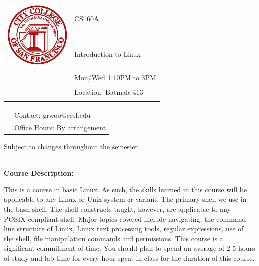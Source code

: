 \documentclass[11pt]{article}
\begin{document}
\begin{tabular}{ l l }
  \multirow{3}{*}{\includegraphics[height=1.25in,width=1.25in]{logo_ccsf.png}} & \LARGE CS160A \\\\
                                                                             & \LARGE Introduction to Linux \\\\
  & \LARGE Mon/Wed 1:10PM to 3PM \\\\
  & \LARGE Location: Batmale 413\\\\
\end{tabular}
\vspace{10mm}

\begin{tabular}{ l l }
  & \large Contact: grwoo@ccsf.edu \\
  & \large Office Hours: By arrangement\\
\end{tabular}
\vspace{5mm}
\begin{center} Subject to changes throughout the semester.\\
\end{center}

\textbf {\large \\ Course Description:}

This is a course in basic Linux. As such, the skills learned in this course
will be applicable to any Linux or Unix system or variant. The primary shell we
use in the bash shell. The shell constructs taught, however, are applicable to
any POSIX-compliant shell. Major topics covered include navigating, the
command-line structure of Linux, Linux text processing tools, regular
expressions, use of the shell, file manipulation commands and permissions.
This course is a significant commitment of time. You should plan to spend an
average of 2-5 hours of study and lab time for every hour spent in class for
the duration of this course.\\
\end{document}
